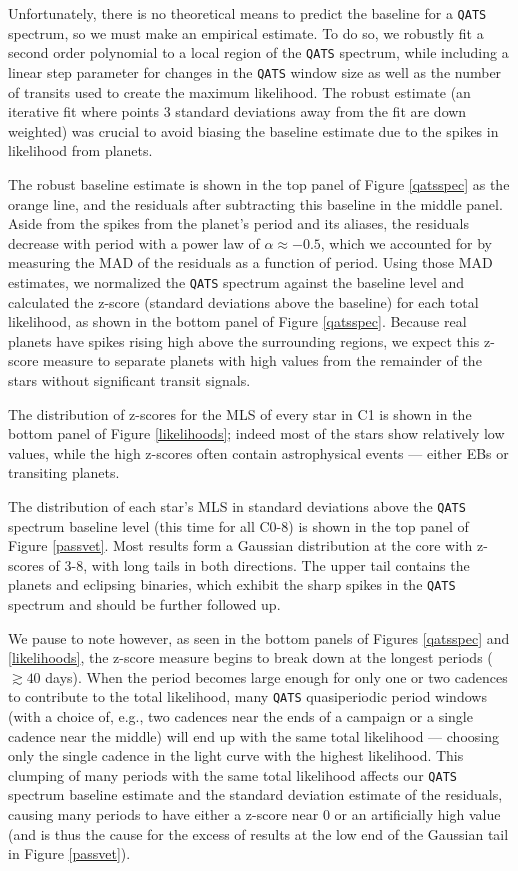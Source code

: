 \documentclass[twocolumn]{aastex62}
\newcommand{\pipeline}[1]{\texttt{#1}}
\begin{document}
Unfortunately, there is no theoretical means to predict the baseline
for a \pipeline{QATS} spectrum, so we must make an empirical
estimate. To do so, we robustly fit a second order polynomial to a
local region of the \pipeline{QATS} spectrum, while including a linear
step parameter for changes in the \pipeline{QATS} window size as well
as the number of transits used to create the maximum likelihood. The
robust estimate (an iterative fit where points 3 standard deviations
away from the fit are down weighted) was crucial to avoid biasing the
baseline estimate due to the spikes in likelihood from planets.

The robust baseline estimate is shown in the top panel of Figure
\ref{qatsspec} as the orange line, and the residuals after subtracting
this baseline in the middle panel. Aside from the spikes from the
planet's period and its aliases, the residuals decrease with period
with a power law of $\alpha \approx -0.5$, which we accounted for by
measuring the MAD of the residuals as a function of period. Using
those MAD estimates, we normalized the \pipeline{QATS} spectrum
against the baseline level and calculated the z-score (standard
deviations above the baseline) for each total likelihood, as shown in
the bottom panel of Figure \ref{qatsspec}. Because real planets have
spikes rising high above the surrounding regions, we expect this
z-score measure to separate planets with high values from the
remainder of the stars without significant transit signals.

The distribution of z-scores for the MLS of every star in C1 is shown
in the bottom panel of Figure \ref{likelihoods}; indeed most of the
stars show relatively low values, while the high z-scores often
contain astrophysical events --- either EBs or transiting planets.

The distribution of each star's MLS in standard deviations above the
\pipeline{QATS} spectrum baseline level (this time for all C0-8) is
shown in the top panel of Figure \ref{passvet}. Most results form a
Gaussian distribution at the core with z-scores of 3-8, with long
tails in both directions.  The upper tail contains the planets and
eclipsing binaries, which exhibit the sharp spikes in the
\pipeline{QATS} spectrum and should be further followed up.

We pause to note however, as seen in the bottom panels of Figures
\ref{qatsspec} and \ref{likelihoods}, the z-score measure begins to
break down at the longest periods ($\gtrsim40$ days).  When the period
becomes large enough for only one or two cadences to contribute to the
total likelihood, many \pipeline{QATS} quasiperiodic period windows
(with a choice of, e.g., two cadences near the ends of a campaign or a
single cadence near the middle) will end up with the same total
likelihood --- choosing only the single cadence in the light curve
with the highest likelihood. This clumping of many periods with the
same total likelihood affects our \pipeline{QATS} spectrum baseline
estimate and the standard deviation estimate of the residuals, causing
many periods to have either a z-score near 0 or an artificially high
value (and is thus the cause for the excess of results at the low end
of the Gaussian tail in Figure \ref{passvet}).
\end{document}
